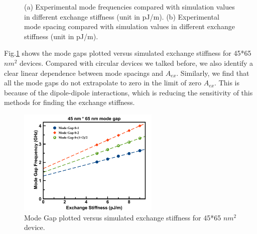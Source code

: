 \begin{figure}[!ht]
\centering
{}
\caption{(a) Experimental mode frequencies compared with simulation values in different exchange stiffness (unit in pJ/m).
 (b) Experimental mode spacing compared with simulation values in different exchange stiffness (unit in pJ/m). }
\end{figure}


Fig.\ref{fig:4565ex} shows the mode gaps plotted versus simulated exchange stiffness for 45*65 $nm^2$ devices. Compared with circular devices we talked before, we also identify a clear linear dependence between mode spacings and $A_{ex}$. Similarly, we find that all the mode gaps do not extrapolate to zero in the limit of zero $A_{ex}$. This is because of the dipole-dipole interactions, which is reducing the sensitivity of this methods for finding the exchange stiffness.

\clearpage

\begin{figure}[!ht]
  \centering
  \includegraphics[width=0.6\textwidth]{fig/stadium/4565ex}
   \caption{Mode Gap plotted versus simulated exchange stiffness for 45*65 $nm^2$ device.}
  \label{fig:4565ex}
\end{figure}

